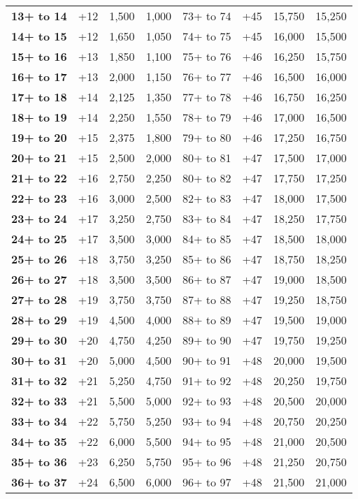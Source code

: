 \begin {table}[H]
\begin{tabularx}{\columnwidth}{>{\bfseries}YYYYYYYY}
	13+ to 14 & +12 & 1,500 & 1,000 & 73+ to 74 & +45 & 15,750 & 15,250\\
	14+ to 15 & +12 & 1,650 & 1,050 & 74+ to 75 & +45 & 16,000 & 15,500\\
	15+ to 16 & +13 & 1,850 & 1,100 & 75+ to 76 & +46 & 16,250 & 15,750\\
	16+ to 17 & +13 & 2,000 & 1,150 & 76+ to 77 & +46 & 16,500 & 16,000\\
	17+ to 18 & +14 & 2,125 & 1,350 & 77+ to 78 & +46 & 16,750 & 16,250\\
	18+ to 19 & +14 & 2,250 & 1,550 & 78+ to 79 & +46 & 17,000 & 16,500\\
	19+ to 20 & +15 & 2,375 & 1,800 & 79+ to 80 & +46 & 17,250 & 16,750\\
	20+ to 21 & +15 & 2,500 & 2,000 & 80+ to 81 & +47 & 17,500 & 17,000\\
	21+ to 22 & +16 & 2,750 & 2,250 & 80+ to 82 & +47 & 17,750 & 17,250\\
	22+ to 23 & +16 & 3,000 & 2,500 & 82+ to 83 & +47 & 18,000 & 17,500\\
	23+ to 24 & +17 & 3,250 & 2,750 & 83+ to 84 & +47 & 18,250 & 17,750\\
	24+ to 25 & +17 & 3,500 & 3,000 & 84+ to 85 & +47 & 18,500 & 18,000\\
	25+ to 26 & +18 & 3,750 & 3,250 & 85+ to 86 & +47 & 18,750 & 18,250\\
	26+ to 27 & +18 & 3,500 & 3,500 & 86+ to 87 & +47 & 19,000 & 18,500\\
	27+ to 28 & +19 & 3,750 & 3,750 & 87+ to 88 & +47 & 19,250 & 18,750\\
	28+ to 29 & +19 & 4,500 & 4,000 & 88+ to 89 & +47 & 19,500 & 19,000\\
	29+ to 30 & +20 & 4,750 & 4,250 & 89+ to 90 & +47 & 19,750 & 19,250\\
	30+ to 31 & +20 & 5,000 & 4,500 & 90+ to 91 & +48 & 20,000 & 19,500\\
	31+ to 32 & +21 & 5,250 & 4,750 & 91+ to 92 & +48 & 20,250 & 19,750\\
	32+ to 33 & +21 & 5,500 & 5,000 & 92+ to 93 & +48 & 20,500 & 20,000\\
	33+ to 34 & +22 & 5,750 & 5,250 & 93+ to 94 & +48 & 20,750 & 20,250\\
	34+ to 35 & +22 & 6,000 & 5,500 & 94+ to 95 & +48 & 21,000 & 20,500\\
	35+ to 36 & +23 & 6,250 & 5,750 & 95+ to 96 & +48 & 21,250 & 20,750\\
	36+ to 37 & +24 & 6,500 & 6,000 & 96+ to 97 & +48 & 21,500 & 21,000\\

\end{tabularx}
\end{table}
